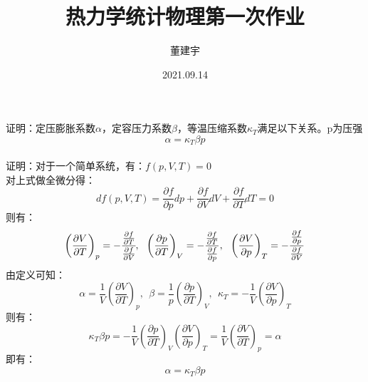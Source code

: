 \documentclass[a4paper,12pt]{article}
\title{热力学统计物理第一次作业}
\date{2021.09.14}
\author{董建宇}
\begin{document}
\maketitle
\titleformat{\section}[hang]{\small}{\thesection}{0.8em}{}{}
\titleformat{\subsection}[hang]{\small}{\thesubsection}{0.8em}{}{}
\begin{section}{}
    证明：定压膨胀系数$\alpha$，定容压力系数$\beta$，等温压缩系数$\kappa_{T}$满足以下关系。p为压强
    \begin{equation}\nonumber
        \alpha=\kappa_T\beta p
    \end{equation}\\
    证明：对于一个简单系统，有：$f(p,V,T)=0$\\
    对上式做全微分得：
    \begin{equation}\nonumber
        df(p,V,T)=\frac{\partial f}{\partial p}dp+\frac{\partial f}{\partial V}dV+\frac{\partial f}{\partial T}dT=0
    \end{equation}
    则有：
    \begin{equation}\nonumber
        \left(\frac{\partial V}{\partial T}\right)_{p}=-\cfrac{\frac{\partial f}{\partial T}}{\frac{\partial f}{\partial V}},~~  
        \left(\frac{\partial p}{\partial T}\right)_{V}=-\frac{\frac{\partial f}{\partial T}}{\frac{\partial f}{\partial p}},~~ 
        \left(\frac{\partial V}{\partial p}\right)_T=-\frac{\frac{\partial f}{\partial p}}{\frac{\partial f}{\partial V}}
    \end{equation}
    由定义可知：
    \begin{equation}\nonumber
        \alpha=\frac{1}{V}\left(\frac{\partial V}{\partial T}\right)_p,~~ \beta=\frac{1}{p}\left(\frac{\partial p}{\partial T}\right)_V,~~ \kappa_T=-\frac{1}{V}\left(\frac{\partial V}{\partial p}\right)_T
    \end{equation}
    则有：
    \begin{equation}\nonumber
        \kappa_T\beta p=-\frac{1}{V}\left(\frac{\partial p}{\partial T}\right)_{V}\left(\frac{\partial V}{\partial p}\right)_T=\frac{1}{V}\left(\frac{\partial V}{\partial T}\right)_p=\alpha
    \end{equation}
    即有：
    \begin{equation}\nonumber
        \alpha = \kappa_T\beta p
    \end{equation}
\end{section}
\end{document}
